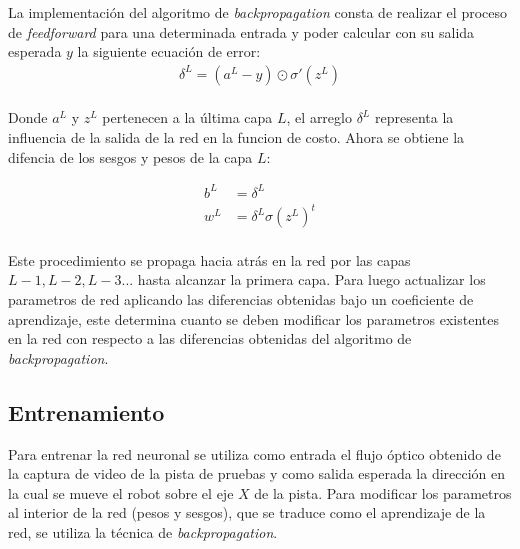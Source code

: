 \documentclass{iccmemoria}
\begin{document}
La implementación del algoritmo de \emph{backpropagation} consta de realizar el proceso de \emph{feedforward} para una determinada entrada y poder calcular con su salida esperada $y$ la siguiente ecuación de error:\\

\begin{equation}
	\begin{split}
	\delta^L = (a^L-y) \odot \sigma'(z^L)
	\end{split}
\end{equation}\\

Donde $a^{L}$ y $z^{L}$ pertenecen a la última capa $L$, el arreglo $\delta^{L}$ representa la influencia de la salida de la red en la funcion de costo. Ahora se obtiene la difencia de los sesgos y pesos de la capa $L$:

\begin{equation}
	\begin{split}
	b^L & = \delta^L\\
	w^L & = \delta^L \sigma(z^L)^t
	\end{split}
\end{equation}\\

Este procedimiento se propaga hacia atrás en la red por las capas $L-1, L-2, L-3...$ hasta alcanzar la primera capa. Para luego actualizar los parametros de red aplicando las diferencias obtenidas bajo un coeficiente de aprendizaje, este determina cuanto se deben modificar los parametros existentes en la red con respecto a las diferencias obtenidas del algoritmo de \emph{backpropagation}.


\subsection{Entrenamiento}

Para entrenar la red neuronal se utiliza como entrada el flujo óptico obtenido de la captura de video de la pista de pruebas y como salida esperada la dirección en la cual se mueve el robot sobre el eje $X$ de la pista. Para modificar los parametros al interior de la red (pesos y sesgos), que se traduce como el aprendizaje de la red, se utiliza la técnica de \emph{backpropagation}.\\
\end{document}
